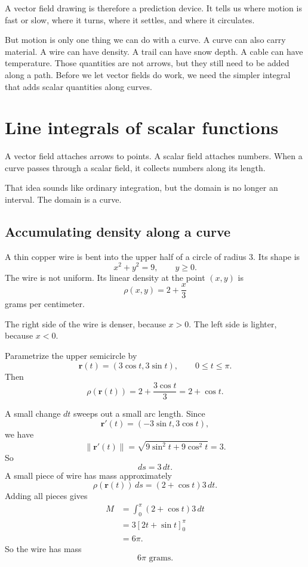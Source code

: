 A vector field drawing is therefore a prediction device.  It tells us where motion is
fast or slow, where it turns, where it settles, and where it circulates.

But motion is only one thing we can do with a curve.  A curve can also carry material.
A wire can have density.  A trail can have snow depth.  A cable can have temperature.
Those quantities are not arrows, but they still need to be added along a path.  Before
we let vector fields do work, we need the simpler integral that adds scalar quantities
along curves.

\section{Line integrals of scalar functions}
\label{sec:13.2}

A vector field attaches arrows to points.  A scalar field attaches numbers.  When a
curve passes through a scalar field, it collects numbers along its length.

That idea sounds like ordinary integration, but the domain is no longer an interval.
The domain is a curve.

\subsection{Accumulating density along a curve}

A thin copper wire is bent into the upper half of a circle of radius \(3\).  Its shape is
\[
    x^2+y^2=9,
    \qquad
    y\ge0.
\]
The wire is not uniform.  Its linear density at the point \((x,y)\) is
\[
    \rho(x,y)=2+\frac{x}{3}
\]
grams per centimeter.

The right side of the wire is denser, because \(x>0\).  The left side is lighter, because
\(x<0\).

Parametrize the upper semicircle by
\[
    \mathbf r(t)=(3\cos t,3\sin t),
    \qquad
    0\le t\le \pi.
\]
Then
\[
    \rho(\mathbf r(t))
    =
    2+\frac{3\cos t}{3}
    =
    2+\cos t.
\]

A small change \(dt\) sweeps out a small arc length.  Since
\[
    \mathbf r'(t)=(-3\sin t,3\cos t),
\]
we have
\[
    \|\mathbf r'(t)\|
    =
    \sqrt{9\sin^2t+9\cos^2t}
    =
    3.
\]
So
\[
    ds=3\,dt.
\]
A small piece of wire has mass approximately
\[
    \rho(\mathbf r(t))\,ds
    =
    (2+\cos t)3\,dt.
\]
Adding all pieces gives
\[
\begin{aligned}
M
&=
\int_0^\pi (2+\cos t)3\,dt\\
&=
3\left[2t+\sin t\right]_0^\pi\\
&=
6\pi.
\end{aligned}
\]
So the wire has mass
\[
\boxed{
    6\pi \text{ grams}.
}
\]

